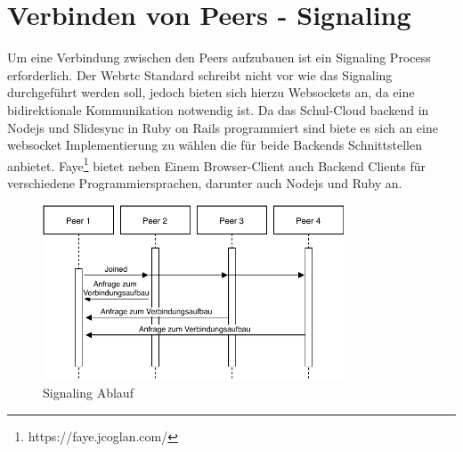 
\section{Verbinden von Peers - Signaling}
Um eine Verbindung zwischen den Peers aufzubauen ist ein Signaling Process erforderlich. Der Webrtc Standard schreibt nicht vor wie das Signaling durchgeführt werden soll, jedoch bieten sich hierzu Websockets an, da eine bidirektionale Kommunikation notwendig ist. Da das Schul-Cloud backend in Nodejs und Slidesync in Ruby on Rails programmiert sind biete es sich an eine websocket Implementierung zu wählen die für beide Backends Schnittstellen anbietet. Faye\footnote{https://faye.jcoglan.com/} bietet neben Einem Browser-Client auch Backend Clients für verschiedene Programmiersprachen, darunter auch Nodejs und Ruby an. 
\begin{figure}[!h]
	\centering
	\includegraphics[width=0.8\textwidth]{figures/Signaling}
	\caption[A Figure Short-Title]{Signaling Ablauf}
	\label{fig:mesh}
\end{figure}

